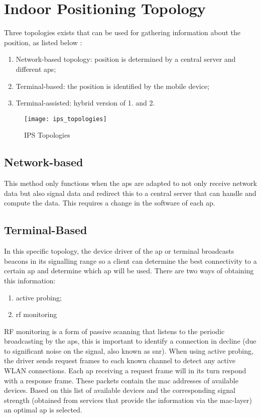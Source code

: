 \section{Indoor Positioning Topology}
Three topologies exists that can be used for gathering information about the position, as listed below \cite{Henniges2012}:
\begin{enumerate}
\item Network-based topology: position is determined by a central server and different \acrshort{ap}s;
\item Terminal-based: the position is identified by the mobile device;
\item Terminal-assisted: hybrid version of 1. and 2.
\end{enumerate}
\begin{figure}[h!]
\centering
\texttt{[image: ips\_topologies]}
\caption{IPS Topologies ~\cite{Henniges2012}}
\label{fig:ips_topologies}
\end{figure}
\subsection{Network-based}
This method only functions when the \acrshort{ap}s are adapted to not only receive network data but also signal data and redirect this to a central server that can handle and compute the data. This requires a change in the software of each \acrlong{ap}.
\subsection{Terminal-Based}
In this specific topology, the device driver of the \acrshort{ap} or terminal broadcasts beacons in its signalling range so a client can determine the best connectivity to a certain \acrshort{ap} and determine which \acrshort{ap} will be used. There are two ways of obtaining this information: 
\begin{enumerate}
\item active probing;
\item \acrshort{rf} monitoring
\end{enumerate}
RF monitoring is a form of passive scanning that listens to the periodic broadcasting by the \acrlong{ap}s, this is important to identify a connection in decline (due to significant noise on the signal, also known as \acrfull{snr}). When using active probing, the driver sends request frames to each known channel to detect any active WLAN connections. Each \acrshort{ap} receiving a request frame will in its turn respond with a response frame. These packets contain the \acrshort{mac} addresses of available devices. Based on this list of available devices and the corresponding signal strength (obtained from services that provide the information via the \acrshort{mac}-layer) an optimal \acrshort{ap} is selected\cite[p.~8]{Retscher}.

